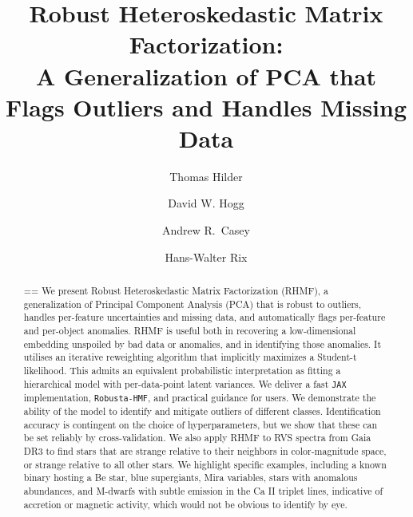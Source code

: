 \documentclass[onecolumn,floatfix,linenumbers,trackchanges]{aastex631}
\begin{document}
\title{Robust Heteroskedastic Matrix Factorization: \\
  A Generalization of PCA that Flags Outliers and Handles Missing Data}
\author[0000-0001-7641-5235]{Thomas Hilder}

\author[0000-0003-2866-9403]{David W. Hogg}

\author[0000-0003-0174-0564]{Andrew R.\ Casey}

\author[0000-0003-4996-9069]{Hans-Walter Rix}

\begin{abstract}\noindent\hsize=\textwidth{}\textwidth\rightskip=\leftskip %
  We present Robust Heteroskedastic Matrix Factorization (RHMF), a generalization of Principal Component Analysis (PCA) that is robust to outliers, handles per-feature uncertainties and missing data, and automatically flags per-feature and per-object anomalies.
  RHMF is useful both in recovering a low-dimensional embedding unspoiled by bad data or anomalies, and in identifying those anomalies.
  It utilises an iterative reweighting algorithm that implicitly maximizes a Student-t likelihood.
  This admits an equivalent probabilistic interpretation as fitting a hierarchical model with per-data-point latent variances.
  We deliver a fast \texttt{JAX} implementation, \texttt{Robusta-HMF}, and practical guidance for users. We demonstrate the ability of the model to identify and mitigate outliers of different classes.
  Identification accuracy is contingent on the choice of hyperparameters, but we show that these can be set reliably by cross-validation.
  We also apply RHMF to RVS spectra from Gaia DR3 to find  stars that are strange relative to their neighbors in color-magnitude space, or strange relative to all other stars.
  We highlight specific examples, including a known binary hosting a Be star, blue supergiants, Mira variables, stars with anomalous abundances, and M-dwarfs with subtle emission in the Ca II triplet lines, indicative of accretion or magnetic activity, which would not be obvious to identify by eye.
  \end{abstract}
\end{document}
